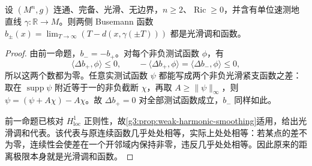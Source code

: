 \begin{proposition}\label{g3:prop:line-busemann-smooth-harmonic}
	设 \((M^n,g)\) 连通、完备、光滑、无边界，\(n\ge2\)、\(\operatorname{Ric}\ge0\)，并含有单位速测地直线 \(\gamma:\mathbb R\to M\)。则两侧 Busemann 函数 \(b_\pm(x)=\lim_{T\to\infty}(T-d(x,\gamma(\pm T)))\) 都是光滑调和函数。
\end{proposition}
\begin{proof}
	由前一命题，\(b_-=-b_+\)。对每个非负测试函数 \(\phi\)，有
	\[
		\langle\Delta b_+,\phi\rangle\le0,
		\qquad
		-\langle\Delta b_+,\phi\rangle
		=\langle\Delta b_-,\phi\rangle\le0,
	\]
	所以这两个数都为零。任意实测试函数 \(\psi\) 都能写成两个非负光滑紧支函数之差：取在 \(\operatorname{supp}\psi\) 附近等于一的非负截断 \(\chi\)，再取 \(A\ge\|\psi\|_\infty\)，则
	\(\psi=(\psi+A\chi)-A\chi\)。故 \(\Delta b_+=0\) 对全部测试函数成立，\(b_-\) 同样如此。

	前一命题已核对 \(H^1_{\mathrm{loc}}\) 正则性，故\cref{g3:prop:weak-harmonic-smoothing}适用，给出光滑调和代表。该代表与原连续函数几乎处处相等，实际上处处相等：若某点的差不为零，连续性会使差在一个开邻域内保持非零，违反几乎处处相等。因此原来的距离极限本身就是光滑调和函数。
\end{proof}

